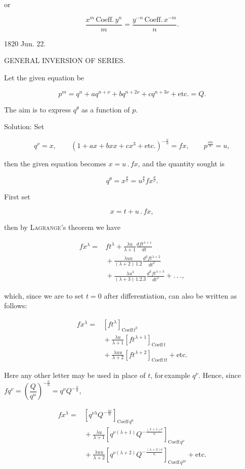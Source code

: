 \noindent or

\[
\frac{x^m\,\text{Coeff.}\,y^n}{m} = \frac{y^{-n}\,\text{Coeff.}\,x^{-m}}{n}.
\]

1820 Jun. 22.



\begin{center}
GENERAL INVERSION OF SERIES.
\end{center}

\noindent\hspace*{\parindent}Let the given equation be

\[
p^m = q^n+aq^{n+\nu}+bq^{n+2\nu}+cq^{n+3\nu}+\text{etc.} = Q.
\]

\noindent The aim is to express $q^\theta$ as a function of $p$.

Solution: Set

\[
q^\nu = x,\qquad (1+ax+bxx+cx^3+\text{etc.})^{-\frac{\nu}{n}} = fx,\qquad p^{\frac{\nu m}{n}} = u,
\]

\noindent then the given equation becomes $x = u\,.\,fx$, and the quantity sought is

\[
q^\theta = x^{\frac{\theta}{\nu}} = u^{\frac{\theta}{\nu}}fx^{\frac{\theta}{\nu}}.
\]

First set

\[
x = t+u\,.\,fx,
\]

\noindent then by \textsc{Lagrange}'s theorem we have

\[
\begin{aligned}fx^\lambda ={}& ft^\lambda + \frac{\lambda u}{\lambda+1}\frac{dft^{\lambda+1}}{dt} \\ &{}+ \frac{\lambda uu}{(\lambda+2)\,1.2}\frac{d^2ft^{\lambda+2}}{dt^2} \\ &{}+ \frac{\lambda u^3}{(\lambda+3)\,1.2.3}\frac{d^3ft^{\lambda+3}}{dt^3}+.\,.\,.,
\end{aligned}
\]

\noindent which, since we are to set $t=0$ after differentiation, can also be written as follows:

\[
\begin{aligned}fx^\lambda ={}& [ft^\lambda]_{\text{Coeff}\,t^0}\\ &{}+ \frac{\lambda u}{\lambda+1}[ft^{\lambda+1}]_{\text{Coeff}\,t}\\ &{}+ \frac{\lambda uu}{\lambda+2}[ft^{\lambda+2}]_{\text{Coeff}\,tt}+\text{etc.}
\end{aligned}
\]

Here any other letter may be used in place of $t$, for\,example $q^\nu$. Hence, since $fq^\nu = \left(\dfrac{Q}{q^n}\right)^{-\frac{\nu}{n}} = q^\nu Q^{-\frac{\nu}{n}}$,

\[
\begin{aligned}fx^\lambda ={}& \left[q^{\nu\lambda}Q^{-\frac{\lambda\nu}{n}}\right]_{\text{Coeff}\,q^0}\\ &{}+ \frac{\lambda u}{\lambda+1}\left[q^{\nu(\lambda+1)}Q^{-\frac{(\lambda+1)\nu}{n}}\right]_{\text{Coeff}\,q^\nu}\\ &{}+ \frac{\lambda uu}{\lambda+2}\left[q^{\nu(\lambda+2)}Q^{-\frac{(\lambda+2)\nu}{n}}\right]_{\text{Coeff}\,q^{2\nu}}+\text{etc.}
\end{aligned}
\]

